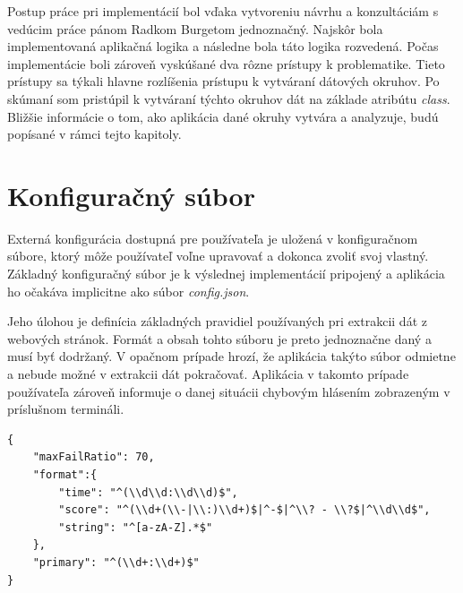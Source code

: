 \bigskip

Postup práce pri implementácií bol vďaka vytvoreniu návrhu a konzultáciám s vedúcim práce pánom Radkom Burgetom jednoznačný. Najskôr bola implementovaná aplikačná logika a následne bola táto logika rozvedená. Počas implementácie boli zároveň vyskúšané dva rôzne prístupy k problematike. Tieto prístupy sa týkali hlavne rozlíšenia prístupu k vytváraní dátových okruhov. Po skúmaní som pristúpil k vytváraní týchto okruhov dát na základe atribútu \textit{class}. Bližšie informácie o tom, ako aplikácia dané okruhy vytvára a analyzuje, budú popísané v rámci tejto kapitoly.

\section{Konfiguračný súbor}

Externá konfigurácia dostupná pre používateľa je uložená v konfiguračnom súbore, ktorý môže používateľ voľne upravovať a dokonca zvoliť svoj vlastný. Základný konfiguračný súbor je k výslednej implementácií pripojený a aplikácia ho očakáva implicitne ako súbor \textit{config.json}.

Jeho úlohou je definícia základných pravidiel používaných pri extrakcii dát z webových stránok. Formát a obsah tohto súboru je preto jednoznačne daný a musí byť dodržaný. V opačnom prípade hrozí, že aplikácia takýto súbor odmietne a nebude možné v extrakcii dát pokračovať. Aplikácia v takomto prípade používateľa zároveň informuje o danej situácii chybovým hlásením zobrazeným v príslušnom termináli. 
\newpage

\begin{lstlisting}[caption={Príklad konfiguračného súboru},captionpos=b,label={config_ex}]
{
    "maxFailRatio": 70,
    "format":{
        "time": "^(\\d\\d:\\d\\d)$",
        "score": "^(\\d+(\\-|\\:)\\d+)$|^-$|^\\? - \\?$|^\\d\\d$",
        "string": "^[a-zA-Z].*$"
    },
    "primary": "^(\\d+:\\d+)$"
}
\end{lstlisting}

